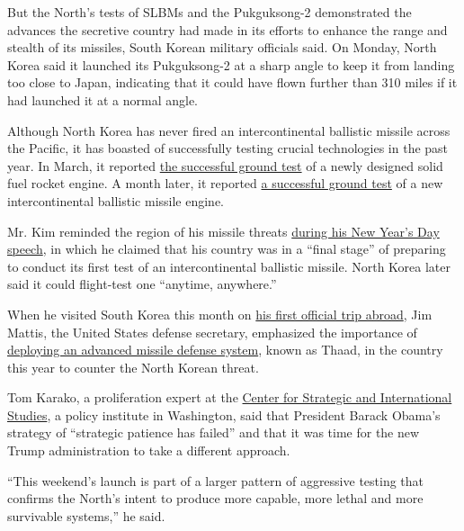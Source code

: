 But the North's tests of SLBMs and the Pukguksong-2 demonstrated the
advances the secretive country had made in its efforts to enhance the
range and stealth of its missiles, South Korean military officials said.
On Monday, North Korea said it launched its Pukguksong-2 at a sharp
angle to keep it from landing too close to Japan, indicating that it
could have flown further than 310 miles if it had launched it at a
normal angle.

Although North Korea has never fired an intercontinental ballistic
missile across the Pacific, it has boasted of successfully testing
crucial technologies in the past year. In March, it reported
\href{https://www.nytimes3xbfgragh.onion/2016/03/25/world/asia/north-korea-solid-fuel-rocket-engine.html}{the
successful ground test} of a newly designed solid fuel rocket engine. A
month later, it reported
\href{https://www.nytimes3xbfgragh.onion/2016/04/10/world/asia/north-korea-says-it-successfully-tested-missile-engine.html}{a
successful ground test} of a new intercontinental ballistic missile
engine.

Mr. Kim reminded the region of his missile threats
\href{https://www.nytimes3xbfgragh.onion/2017/01/01/world/asia/north-korea-intercontinental-ballistic-missile-test-kim-jong-un.html}{during
his New Year's Day speech}, in which he claimed that his country was in
a ``final stage'' of preparing to conduct its first test of an
intercontinental ballistic missile. North Korea later said it could
flight-test one ``anytime, anywhere.''

When he visited South Korea this month on
\href{https://www.nytimes3xbfgragh.onion/2017/02/05/us/politics/jim-mattis-south-korea-japan.html}{his
first official trip abroad}, Jim Mattis, the United States defense
secretary, emphasized the importance of
\href{https://www.nytimes3xbfgragh.onion/2017/02/02/world/asia/james-mattis-us-korea-thaad.html}{deploying
an advanced missile defense system}, known as Thaad, in the country this
year to counter the North Korean threat.

Tom Karako, a proliferation expert at the
\href{https://www.csis.org/}{Center for Strategic and International
Studies}, a policy institute in Washington, said that President Barack
Obama's strategy of ``strategic patience has failed'' and that it was
time for the new Trump administration to take a different approach.

``This weekend's launch is part of a larger pattern of aggressive
testing that confirms the North's intent to produce more capable, more
lethal and more survivable systems,'' he said.

